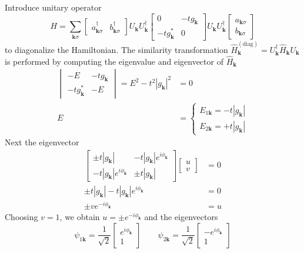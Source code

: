 \documentclass[../../../main.tex]{subfiles}
\begin{document}
Introduce unitary operator
\begin{equation*}
  H = \sum_{\mathbf{k}\sigma}
  \begin{bmatrix} a_{\mathbf{k}\sigma}^\dagger & b_{\mathbf{k}\sigma}^\dagger \end{bmatrix}
  U_\mathbf{k } U_{\mathbf{ k}} ^\dagger
  \begin{bmatrix} 0 & -t g_\mathbf{k} \\ -t g_\mathbf{k}^* & 0 \end{bmatrix}
  U_\mathbf{k }U_\mathbf{k }^\dagger
  \begin{bmatrix} a_{\mathbf{k}\sigma} \\ b_{\mathbf{k}\sigma} \end{bmatrix}
\end{equation*}
to diagonalize the Hamiltonian.
The similarity transformation $\hat{H}_\mathbf{k}^{(\mathrm{diag})} = U_\mathbf{k}^\dagger \hat{H}_\mathbf{k} U_\mathbf{k}$ is performed by computing the eigenvalue and eigenvector of $\hat{H}_\mathbf{k}$
\begin{align*}
  \begin{vmatrix}
    -E                & -t g_\mathbf{k} \\
    -t g_\mathbf{k}^* & -E
  \end{vmatrix}
     =  E^2 - t^2 |g_\mathbf{k}|^2 &= 0 \\
  E & = 
  \begin{cases}
    E_{1\mathbf{k}} = -t|g_\mathbf{k}| \\
    E_{2\mathbf{k}} = +t|g_\mathbf{k}|
  \end{cases}
\end{align*}
Next the eigenvector
\begin{align*}
    \begin{bmatrix} 
      \pm t |g_{\mathbf{k}}| & -t |g_{\mathbf{k}}| e^{i \phi_\mathbf{k}} \\ 
      -t |g_{\mathbf{k}}|e^{i \phi_\mathbf{k}} & \pm t|g_{\mathbf{k}}| 
    \end{bmatrix}
  \begin{bmatrix}
    u\\v
  \end{bmatrix} & =  0\\
 \pm t|g_\mathbf{k}| -t |g_\mathbf{k}| e^{i \phi_\mathbf{k}} & =  0 \\
 \pm v e^{-i \phi_\mathbf{k}}  & =  u
\end{align*}
Choosing $v=1$, we obtain $u = \pm e^{-i \phi_\mathbf{k}}$ and the eigenvectors 
\begin{equation*}
  \psi_{1\mathbf{k}} = \frac{1}{\sqrt{2}}\begin{bmatrix}e^{i\phi_\mathbf{k}}\\1\end{bmatrix}
\qquad
\psi_{2\mathbf{k}} = \frac{1}{\sqrt{2}}\begin{bmatrix}-e^{i\phi_\mathbf{k}}\\1\end{bmatrix}
\end{equation*}
\end{document}
